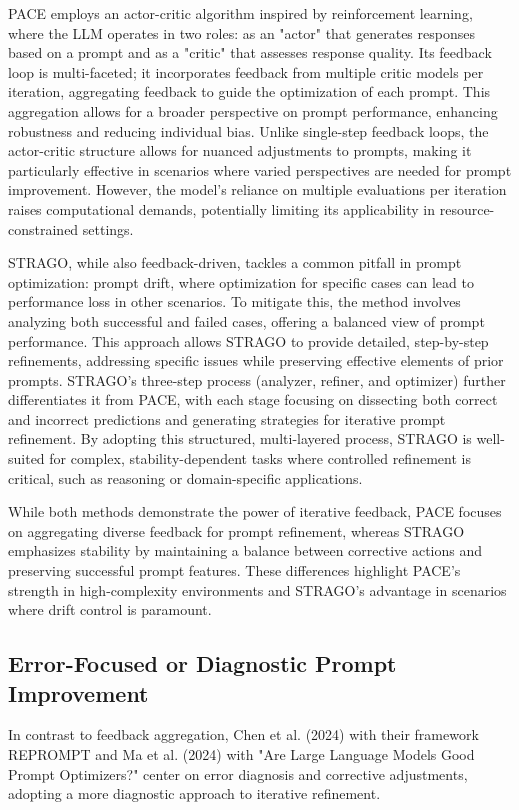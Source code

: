 \documentclass[runningheads]{llncs}
\begin{document}
PACE employs an actor-critic algorithm inspired by reinforcement learning, where the LLM operates in two roles: as an "actor" that generates responses based on a prompt and as a "critic" that assesses response quality. Its feedback loop is multi-faceted; it incorporates feedback from multiple critic models per iteration, aggregating feedback to guide the optimization of each prompt. This aggregation allows for a broader perspective on prompt performance, enhancing robustness and reducing individual bias. Unlike single-step feedback loops, the actor-critic structure allows for nuanced adjustments to prompts, making it particularly effective in scenarios where varied perspectives are needed for prompt improvement. However, the model’s reliance on multiple evaluations per iteration raises computational demands, potentially limiting its applicability in resource-constrained settings.

STRAGO, while also feedback-driven, tackles a common pitfall in prompt optimization: prompt drift, where optimization for specific cases can lead to performance loss in other scenarios. To mitigate this, the method involves analyzing both successful and failed cases, offering a balanced view of prompt performance. This approach allows STRAGO to provide detailed, step-by-step refinements, addressing specific issues while preserving effective elements of prior prompts. STRAGO’s three-step process (analyzer, refiner, and optimizer) further differentiates it from PACE, with each stage focusing on dissecting both correct and incorrect predictions and generating strategies for iterative prompt refinement. By adopting this structured, multi-layered process, STRAGO is well-suited for complex, stability-dependent tasks where controlled refinement is critical, such as reasoning or domain-specific applications.

While both methods demonstrate the power of iterative feedback, PACE focuses on aggregating diverse feedback for prompt refinement, whereas STRAGO emphasizes stability by maintaining a balance between corrective actions and preserving successful prompt features. These differences highlight PACE’s strength in high-complexity environments and STRAGO’s advantage in scenarios where drift control is paramount.

\subsection{Error-Focused or Diagnostic Prompt Improvement}
In contrast to feedback aggregation, Chen et al. (2024) \cite{chen2024repromptplanningautomaticprompt} with their framework REPROMPT and Ma et al. (2024) \cite{ma2024largelanguagemodelsgood} with "Are Large Language Models Good Prompt Optimizers?" center on error diagnosis and corrective adjustments, adopting a more diagnostic approach to iterative refinement.
\end{document}
